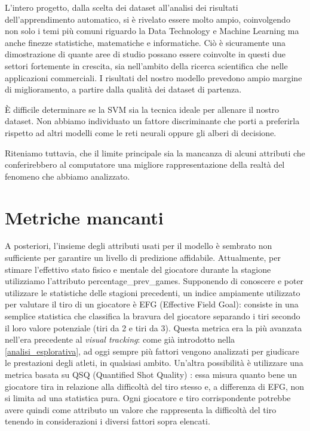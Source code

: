 L'intero progetto, dalla scelta dei dataset all'analisi dei risultati dell'apprendimento automatico, si è rivelato essere molto ampio, coinvolgendo non solo i temi più comuni riguardo la Data Technology e Machine Learning ma anche finezze statistiche, matematiche e informatiche. Ciò è sicuramente una dimostrazione di quante aree di studio possano essere coinvolte in questi due settori fortemente in crescita, sia nell'ambito della ricerca scientifica che nelle applicazioni commerciali.
I risultati del nostro modello prevedono ampio margine di miglioramento, a partire dalla qualità dei dataset di partenza.
\par
È difficile determinare se la SVM sia la tecnica ideale per allenare il nostro dataset. Non abbiamo individuato un fattore discriminante che porti a preferirla rispetto ad altri modelli come le reti neurali oppure gli alberi di decisione.
\par
Riteniamo tuttavia, che il limite principale sia la mancanza di alcuni attributi che conferirebbero al computatore una migliore rappresentazione della realtà del fenomeno che abbiamo analizzato.


\section{Metriche mancanti}
\label{metrichemancanti}
A posteriori, l'insieme degli attributi usati per il modello è sembrato non sufficiente per garantire un livello di predizione affidabile.
Attualmente, per stimare l'effettivo stato fisico e mentale del giocatore durante la stagione utilizziamo l'attributo percentage\_prev\_games. Supponendo di conoscere e poter utilizzare le statistiche delle stagioni precedenti, un indice ampiamente utilizzato per valutare il tiro di un giocatore è EFG (Effective Field Goal): consiste in una semplice statistica che classifica la bravura del giocatore separando i tiri secondo il loro valore potenziale (tiri da 2 e tiri da 3).
Questa metrica era la più avanzata nell'era precedente al \textit{visual tracking}: come già introdotto nella \autoref{analisi_esplorativa}, ad oggi sempre più fattori vengono analizzati per giudicare le prestazioni degli atleti, in qualsiasi ambito.
Un'altra possibilità è utilizzare una metrica basata su QSQ (Quantified Shot Quality) \cite{chang2014quantifying}: essa misura quanto bene un giocatore tira in relazione alla difficoltà del tiro stesso e, a differenza di EFG, non si limita ad una statistica pura.
Ogni giocatore e tiro corrispondente potrebbe avere quindi come attributo un valore che rappresenta la difficoltà del tiro tenendo in considerazioni i diversi fattori sopra elencati.

